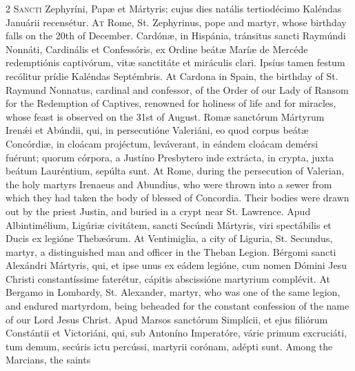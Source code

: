 \begin{paracol}{2}
\lettrine[lines=2]{S}{ancti} Zephyríni, Papæ 
 et Mártyris; cujus dies natális tertiodécimo Kaléndas Januárii recensétur.
\switchcolumn
{}
\lettrine[lines=2]{A}{t} Rome, St. Zephyrinus, pope and 
 martyr, whose birthday falls on the 20th of December.
\switchcolumn*
{}
Cardónæ, in Hispánia, 
 tránsitus sancti Raymúndi Nonnáti, Cardinális et Confessóris, ex Ordine 
 beátæ Maríæ de Mercéde redemptiónis captivórum, vitæ sanctitáte et miráculis 
 clari. Ipsíus tamen festum recólitur prídie Kaléndas Septémbris.
\switchcolumn
{}
At Cardona in Spain, the birthday of 
 St. Raymund Nonnatus, cardinal and confessor, of the Order of our Lady of 
 Ransom for the Redemption of Captives, renowned for holiness of life and for 
 miracles, whose feast is observed on the 31st of August.
\switchcolumn*
{}
Romæ sanctórum Mártyrum 
 Irenǽi et Abúndii, qui, in persecutióne Valeriáni, eo quod corpus beátæ 
 Concórdiæ, in cloácam projéctum, leváverant, in eándem cloácam demérsi 
 fuérunt; quorum córpora, a Justíno Presbytero inde extrácta, in crypta, 
 juxta beátum Lauréntium, sepúlta sunt.
\switchcolumn
{}
At Rome, during the persecution of 
 Valerian, the holy martyrs Irenaeus and Abundius, who were thrown into a 
 sewer from which they had taken the body of blessed of Concordia. 
 Their bodies were drawn out by the priest Justin, and buried in a crypt near 
 St. Lawrence.
\switchcolumn*
{}
Apud Albintimélium, 
 Ligúriæ civitátem, sancti Secúndi Mártyris, viri spectábilis et Ducis ex 
 legióne Thebæórum.
\switchcolumn
{}
At Ventimiglia, a city of Liguria, 
 St. Secundus, martyr, a distinguished man and officer in the Theban Legion.
\switchcolumn*
{}
Bérgomi sancti 
 Alexándri Mártyris, qui, et ipse unus ex eádem legióne, cum nomen Dómini 
 Jesu Christi constantíssime faterétur, cápitis abscissióne martyrium 
 complévit.
\switchcolumn
{}
At Bergamo in Lombardy, St. 
 Alexander, martyr, who was one of the same legion, and endured martyrdom, 
 being beheaded for the constant confession of the name of our Lord Jesus 
 Christ.
\switchcolumn*
{}
Apud Marsos sanctórum 
 Simplícii, et ejus filiórum Constántii et Victoriáni, qui, sub Antoníno 
 Imperatóre, várie primum excruciáti, tum demum, secúris ictu percússi, 
 martyrii corónam, adépti sunt.
\switchcolumn
{}
Among the Marcians, the saints 

\end{paracol}
